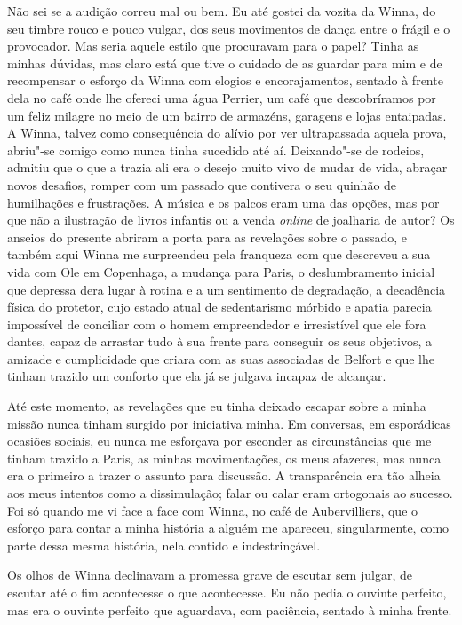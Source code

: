 Não sei se a audição correu mal ou bem. Eu até gostei da vozita da
Winna, do seu timbre rouco e pouco vulgar, dos seus movimentos de dança
entre o frágil e o provocador. Mas seria aquele estilo que procuravam
para o papel? Tinha as minhas dúvidas, mas claro está que tive o cuidado
de as guardar para mim e de recompensar o esforço da Winna com elogios e
encorajamentos, sentado à frente dela no café onde lhe ofereci uma água
Perrier, um café que descobríramos por um feliz milagre no meio de um
bairro de armazéns, garagens e lojas entaipadas. A Winna, talvez como
consequência do alívio por ver ultrapassada aquela prova, abriu"-se
comigo como nunca tinha sucedido até aí. Deixando"-se de rodeios, admitiu
que o que a trazia ali era o desejo muito vivo de mudar de vida,
abraçar novos desafios, romper com um passado que contivera o seu
quinhão de humilhações e frustrações. A música e os palcos eram uma das
opções, mas por que não a ilustração de livros infantis ou a venda
\emph{online }de joalharia de autor? Os anseios do presente abriram a
porta para as revelações sobre o passado, e também aqui Winna me
surpreendeu pela franqueza com que descreveu a sua vida com Ole em
Copenhaga, a mudança para Paris, o deslumbramento inicial que depressa
dera lugar à rotina e a um sentimento de degradação,
a decadência física do protetor, cujo estado atual de
sedentarismo mórbido e apatia parecia impossível de conciliar com o
homem empreendedor e irresistível que ele fora dantes, capaz de arrastar
tudo à sua frente para conseguir os seus objetivos, a amizade e
cumplicidade que criara com as suas associadas de Belfort e que lhe
tinham trazido um conforto que ela já se julgava incapaz de alcançar.

Até este momento, as revelações que eu tinha deixado escapar sobre a
minha missão nunca tinham surgido por iniciativa minha. Em conversas,
em esporádicas ocasiões sociais, eu nunca me esforçava por esconder as
circunstâncias que me tinham trazido a Paris, as minhas movimentações,
os meus afazeres, mas nunca era o primeiro a trazer o assunto para discussão. A transparência era tão alheia aos meus intentos como a
dissimulação; falar ou calar eram ortogonais ao sucesso. Foi só quando
me vi face a face com Winna, no café de Aubervilliers, que o esforço
para contar a minha história a alguém me apareceu, singularmente, como
parte dessa mesma história, nela contido e indestrinçável.

Os olhos de Winna declinavam a promessa grave de escutar sem julgar, de
escutar até o fim acontecesse o que acontecesse. Eu não pedia o ouvinte
perfeito, mas era o ouvinte perfeito que aguardava, com paciência,
sentado à minha frente.

